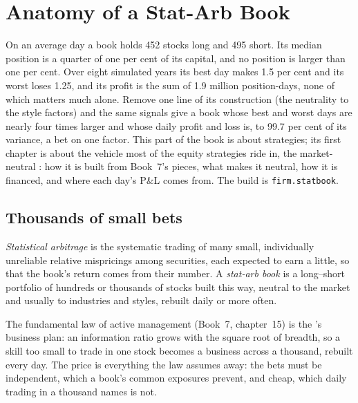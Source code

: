 \chapter{Anatomy of a Stat-Arb Book}\label{ch:s1:anatomy-of-a-stat-arb-book}

On an average day a book holds 452 stocks long and 495 short. Its median position is a quarter of one per cent of its capital, and no position is larger than one per cent.
Over eight simulated years its best day makes 1.5 per cent and its worst loses 1.25, and its profit is the sum of 1.9 million position-days, none of which
matters much alone. Remove one line of its construction (the neutrality to the style factors) and the same signals give a book whose best and worst days are
nearly four times larger and whose daily profit and loss is, to 99.7 per cent of its variance, a bet on one factor. This part of the book is about strategies; its
first chapter is about the vehicle most of the equity strategies ride in, the market-neutral : how it is built from Book~7's pieces, what makes it
neutral, how it is financed, and where each day's P\&L comes from. The build is \texttt{firm.statbook}.

\section{Thousands of small bets}

\begin{definition}\label{def:s1:anatomy-of-a-stat-arb-book:statarb}
\emph{Statistical arbitrage} is the systematic trading of many small, individually unreliable relative mispricings among
securities, each expected to earn a little, so that the book's return comes from their number. A \emph{stat-arb book} is a long--short
portfolio of hundreds or thousands of stocks built this way, neutral to the market and usually to industries and styles, rebuilt daily or more often.
\end{definition}

The fundamental law of active management (Book~7, chapter~15) is the 's business plan: an information ratio grows with the square root of
breadth, so a skill too small to trade in one stock becomes a business across a thousand, rebuilt every day. The price is everything the law assumes away:
the bets must be independent, which a book's common exposures prevent, and cheap, which daily trading in a thousand names is not.

